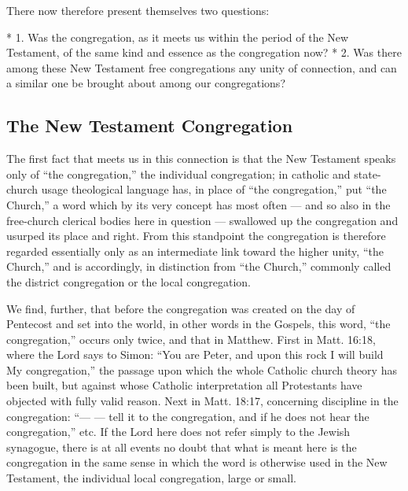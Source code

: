 There now therefore present themselves two questions:

* 1. Was the congregation, as it meets us within the period of the New Testament, of the same kind and essence as the congregation now?
* 2. Was there among these New Testament free congregations any unity of connection, and can a similar one be brought about among our congregations?


























\subsection{The New Testament Congregation}

The first fact that meets us in this connection is that the New Testament speaks only of “the congregation,” the individual congregation; in catholic and state-church usage theological language has, in place of “the congregation,” put “the Church,” a word which by its very concept has most often — and so also in the free-church clerical bodies here in question — swallowed up the congregation and usurped its place and right. From this standpoint the congregation is therefore regarded essentially only as an intermediate link toward the higher unity, “the Church,” and is accordingly, in distinction from “the Church,” commonly called the district congregation or the local congregation.

We find, further, that before the congregation was created on the day of Pentecost and set into the world, in other words in the Gospels, this word, “the congregation,” occurs only twice, and that in Matthew. First in Matt. 16:18, where the Lord says to Simon: “You are Peter, and upon this rock I will build My congregation,” the passage upon which the whole Catholic church theory has been built, but against whose Catholic interpretation all Protestants have objected with fully valid reason. Next in Matt. 18:17, concerning discipline in the congregation: “— — tell it to the congregation, and if he does not hear the congregation,” etc. If the Lord here does not refer simply to the Jewish synagogue, there is at all events no doubt that what is meant here is the congregation in the same sense in which the word is otherwise used in the New Testament, the individual local congregation, large or small.

